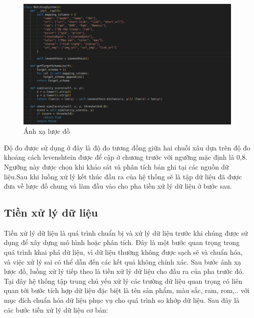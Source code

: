 \documentclass[../DoAn.tex]{subfiles}
\begin{document}
\begin{figure}[H]
    \centering
    \includegraphics[scale=0.33]{Hinhve/schema_matching.png}
    \caption{Ánh xạ lược đồ}
    \label{fig:my_label2}
\end{figure}

Độ đo được sử dụng ở đây là độ đo tương đồng giữa hai chuỗi xâu dựa trên độ đo khoảng cách levenshtein được để cập ở chương trước với ngưỡng mặc định là 0,8. Ngưỡng này được chọn khi khảo sát và phân tích bản ghi tại các nguồn dữ liệu.Sau khi luồng xử lý kết thúc đầu ra của hệ thống sẽ là tập dữ liệu đã được đưa về lược đồ chung và làm đầu vào cho pha tiền xử lý dữ liệu ở bước sau.

\subsection{Tiền xử lý dữ liệu}
Tiền xử lý dữ liệu là quá trình chuẩn bị và xử lý dữ liệu trước khi chúng được sử dụng để xây dựng mô hình hoặc phân tích. Đây là một bước quan trọng trong quá trình khai phá dữ liệu, vì dữ liệu thường không được sạch sẽ và chuẩn hóa, và việc xử lý sai có thể dẫn đến các kết quả không chính xác. Sau bước ánh xạ lược đồ, luồng xử lý tiếp theo là tiền xử lý dữ liệu cho đầu ra của pha trước đó. Tại đây hệ thống tập trung chủ yếu xử lý các trường dữ liệu quan trọng có liên quan tới bước tích hợp dữ liệu đặc biệt là tên sản phẩm, màu sắc, ram, rom,.. với mục đích chuẩn hóa dữ liệu phục vụ cho quá trình so khớp dữ liệu. Sau đây là các bước tiền xử lý dữ liệu cơ bản:
\end{document}
